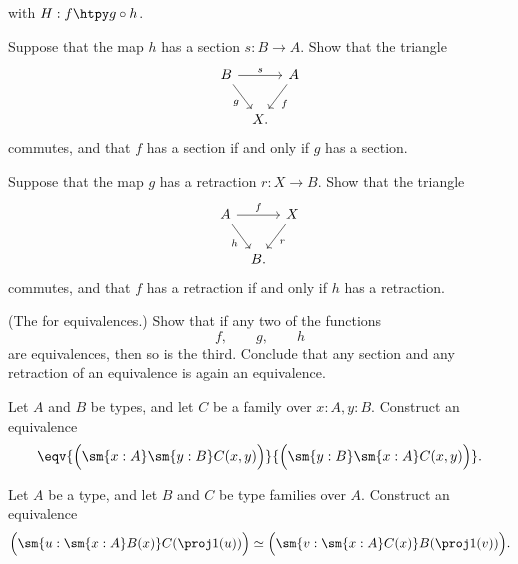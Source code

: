\begin{exercises}
\begin{equation*}
  \end{equation*}
  with $H:f\htpy g\circ h$.
  \begin{subexenum}
  \item Suppose that the map $h$ has a section $s:B \to A$. Show that the triangle
    \begin{equation*}
      \begin{tikzcd}[column sep=tiny]
        B \arrow[rr,"s"] \arrow[dr,swap,"g"] & & A \arrow[dl,"f"] \\
        & X.
      \end{tikzcd}
    \end{equation*}
    commutes, and that $f$ has a section if and only if $g$ has a section.
  \item Suppose that the map $g$ has a retraction $r:X\to B$. Show that the triangle
    \begin{equation*}
      \begin{tikzcd}[column sep=tiny]
        A \arrow[rr,"f"] \arrow[dr,swap,"h"] & & X \arrow[dl,"r"] \\
        & B.
      \end{tikzcd}
    \end{equation*}
    commutes, and that $f$ has a retraction if and only if $h$ has a retraction.
  \item (The  for equivalences.) Show that if any two of the functions
    \begin{equation*}
      f,\qquad g,\qquad h
    \end{equation*}
    are equivalences, then so is the third. Conclude that any section and any retraction of an equivalence is again an equivalence.
  \end{subexenum}
  \exitem \label{ex:sigma_swap}
  \begin{subexenum}
  \item Let $A$ and $B$ be types, and let $C$ be a family over $x:A,y:B$. Construct an equivalence
    \begin{equation*}
      \eqv{\Big(\sm{x:A}\sm{y:B}C(x,y)\Big)}{\Big(\sm{y:B}\sm{x:A}C(x,y)\Big)}.
    \end{equation*}
  \item Let $A$ be a type, and let $B$ and $C$ be type families over $A$. Construct an equivalence
    \begin{equation*}
      \Big(\sm{u:\sm{x:A}B(x)}C(\proj 1(u))\Big) \simeq \Big(\sm{v:\sm{x:A}C(x)}B(\proj 1(v))\Big).

\end{equation*}
\end{subexenum}
\end{exercises}
